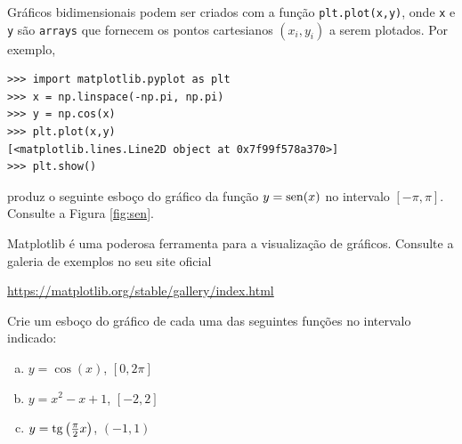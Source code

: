 \documentclass[12pt]{article}
\begin{document}
Gráficos bidimensionais podem ser criados com a função \lstinline+plt.plot(x,y)+, onde \lstinline+x+ e \lstinline+y+ são \lstinline+arrays+ que fornecem os pontos cartesianos $(x_i, y_i)$ a serem plotados. Por exemplo,
\begin{lstlisting}
>>> import matplotlib.pyplot as plt
>>> x = np.linspace(-np.pi, np.pi)
>>> y = np.cos(x)
>>> plt.plot(x,y)
[<matplotlib.lines.Line2D object at 0x7f99f578a370>]
>>> plt.show()
\end{lstlisting}
produz o seguinte esboço do gráfico da função $y=\operatorname{sen}(x)$ no intervalo $[-\pi,\pi]$. Consulte a Figura \ref{fig:sen}.


\begin{obs}
  Matplotlib é uma poderosa ferramenta para a visualização de gráficos. Consulte a galeria de exemplos no seu site oficial
  \begin{center}
    \url{https://matplotlib.org/stable/gallery/index.html}
  \end{center}
\end{obs}

\begin{exr}
  Crie um esboço do gráfico de cada uma das seguintes funções no intervalo indicado:
  \begin{enumerate}[a)]
  \item $y = \cos(x)$, $\left[0, 2\pi\right]$
  \item $y = x^2 - x + 1$, $[-2, 2]$
  \item $y = \operatorname{tg}\left(\frac{\pi}{2}x\right)$, $(-1, 1)$
  \end{enumerate}
\end{exr}


\end{document}
